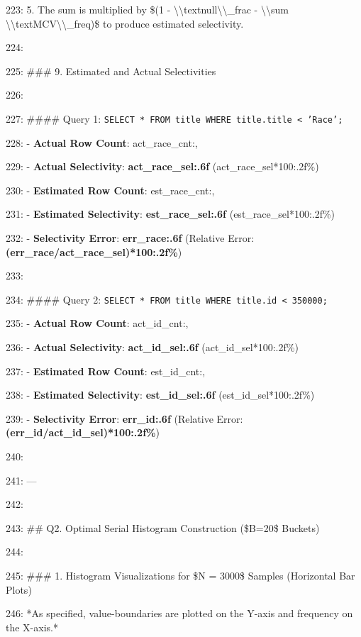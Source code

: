 \documentclass[11pt,a4paper]{article}
\begin{document}
223: 5. The sum is multiplied by \$(1 - \textbackslash{}\textbackslash{}text{{null\textbackslash{}\textbackslash{}\_frac}} - \textbackslash{}\textbackslash{}sum \textbackslash{}\textbackslash{}text{{MCV\textbackslash{}\textbackslash{}\_freq}})\$ to produce estimated selectivity.

224:

225: \#\#\# 9. Estimated and Actual Selectivities

226:

227: \#\#\#\# Query 1: \texttt{SELECT * FROM title WHERE title.title < 'Race';}

228: - \textbf{Actual Row Count}: {act\_race\_cnt:,}

229: - \textbf{Actual Selectivity}: \textbf{{act\_race\_sel:.6f}} ({act\_race\_sel*100:.2f}\%)

230: - \textbf{Estimated Row Count}: {est\_race\_cnt:,}

231: - \textbf{Estimated Selectivity}: \textbf{{est\_race\_sel:.6f}} ({est\_race\_sel*100:.2f}\%)

232: - \textbf{Selectivity Error}: \textbf{{err\_race:.6f}} (Relative Error: \textbf{{(err\_race/act\_race\_sel)*100:.2f}\%})

233:

234: \#\#\#\# Query 2: \texttt{SELECT * FROM title WHERE title.id < 350000;}

235: - \textbf{Actual Row Count}: {act\_id\_cnt:,}

236: - \textbf{Actual Selectivity}: \textbf{{act\_id\_sel:.6f}} ({act\_id\_sel*100:.2f}\%)

237: - \textbf{Estimated Row Count}: {est\_id\_cnt:,}

238: - \textbf{Estimated Selectivity}: \textbf{{est\_id\_sel:.6f}} ({est\_id\_sel*100:.2f}\%)

239: - \textbf{Selectivity Error}: \textbf{{err\_id:.6f}} (Relative Error: \textbf{{(err\_id/act\_id\_sel)*100:.2f}\%})

240:

241: ---

242:

243: \#\# Q2. Optimal Serial Histogram Construction (\$B=20\$ Buckets)

244:

245: \#\#\# 1. Histogram Visualizations for \$N = 3000\$ Samples (Horizontal Bar Plots)

246: *As specified, value-boundaries are plotted on the Y-axis and frequency on the X-axis.*
\end{document}
